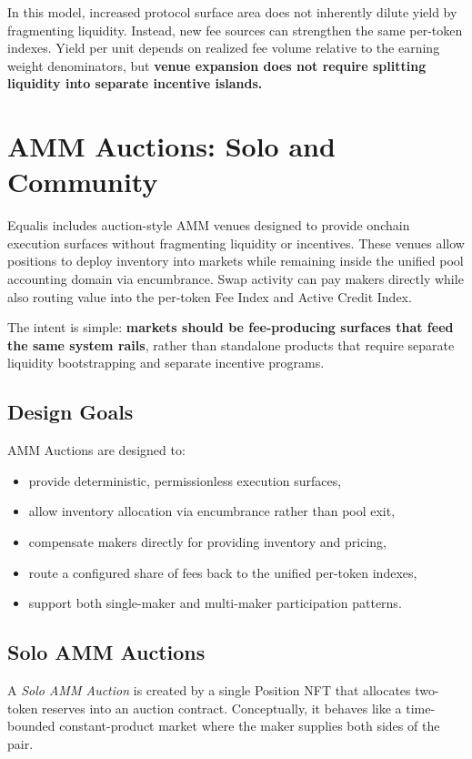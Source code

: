 \documentclass[version=preprint]{iacrcc}
\begin{document}
In this model, increased protocol surface area does not inherently dilute yield by fragmenting liquidity. Instead, new fee sources can strengthen the same per-token indexes. Yield per unit depends on realized fee volume relative to the earning weight denominators, but \textbf{venue expansion does not require splitting liquidity into separate incentive islands.}

\section{AMM Auctions: Solo and Community}

Equalis includes auction-style AMM venues designed to provide onchain execution surfaces without fragmenting liquidity or incentives. These venues allow positions to deploy inventory into markets while remaining inside the unified pool accounting domain via encumbrance. Swap activity can pay makers directly while also routing value into the per-token Fee Index and Active Credit Index.

The intent is simple: \textbf{markets should be fee-producing surfaces that feed the same system rails}, rather than standalone products that require separate liquidity bootstrapping and separate incentive programs.

\subsection{Design Goals}

AMM Auctions are designed to:
\begin{itemize}
  \item provide deterministic, permissionless execution surfaces,
  \item allow inventory allocation via encumbrance rather than pool exit,
  \item compensate makers directly for providing inventory and pricing,
  \item route a configured share of fees back to the unified per-token indexes,
  \item support both single-maker and multi-maker participation patterns.
\end{itemize}

\subsection{Solo AMM Auctions}

A \textit{Solo AMM Auction} is created by a single Position NFT that allocates two-token reserves into an auction contract. Conceptually, it behaves like a time-bounded constant-product market where the maker supplies both sides of the pair.
\end{document}
